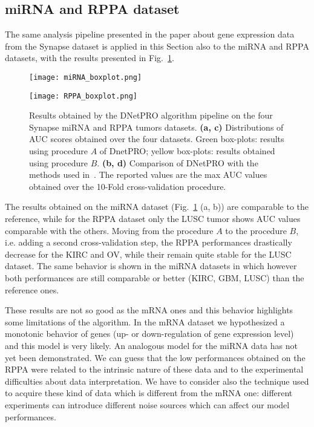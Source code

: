 \documentclass{standalone}
\begin{document}
\subsection[miRNA and RPPA data]{miRNA and RPPA dataset}\label{synapse:miRNA}

The same analysis pipeline presented in the paper about gene expression data from the Synapse dataset is applied in this Section also to the miRNA and RPPA datasets, with the results presented in Fig.~\ref{fig:other_results}.

\begin{figure}[htbp]
\centering
\texttt{[image: miRNA\_boxplot.png]}
\qquad
\def\svgwidth{0.45\textwidth}

\newline
\texttt{[image: RPPA\_boxplot.png]}
\qquad
\centering
\def\svgwidth{0.45\textwidth}

\caption{Results obtained by the \textsf{DNetPRO} algorithm pipeline on the four Synapse miRNA and RPPA tumors datasets.
\textbf{(a, c)} Distributions of AUC scores obtained over the four datasets.
Green box-plots: results using procedure $A$ of DnetPRO; yellow box-plots: results obtained using procedure $B$.
\textbf{(b, d)} Comparison of \textsf{DNetPRO} with the methods used in~\cite{Yuan2014}.
The reported values are the max AUC values obtained over the 10-Fold cross-validation procedure.
}
\label{fig:other_results}
\end{figure}

The results obtained on the miRNA dataset (Fig.~\ref{fig:other_results} (a, b)) are comparable to the reference, while for the RPPA dataset only the LUSC tumor shows AUC values comparable with the others.
Moving from the procedure $A$ to the procedure $B$, i.e. adding a second cross-validation step, the RPPA performances drastically decrease for the KIRC and OV, while their remain quite stable for the LUSC dataset.
The same behavior is shown in the miRNA datasets in which however both performances are still comparable or better (KIRC, GBM, LUSC) than the reference ones.

These results are not so good as the mRNA ones and this behavior highlights some limitations of the algorithm.
In the mRNA dataset we hypothesized a monotonic behavior of genes (up- or down-regulation of gene expression level) and this model is very likely.
An analogous model for the miRNA data has not yet been demonstrated.
We can guess that the low performances obtained on the RPPA were related to the intrinsic nature of these data and to the experimental difficulties about data interpretation.
We have to consider also the technique used to acquire these kind of data which is different from the mRNA one: different experiments can introduce different noise sources which can affect our model performances.
\end{document}
